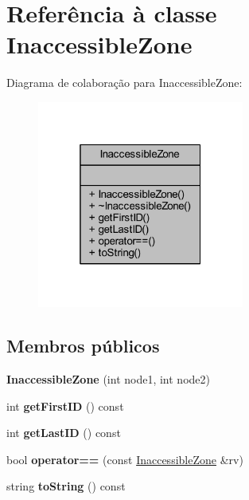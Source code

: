 \hypertarget{class_inaccessible_zone}{}\section{Referência à classe Inaccessible\+Zone}
\label{class_inaccessible_zone}


Diagrama de colaboração para Inaccessible\+Zone\+:
\nopagebreak
\begin{figure}[H]
\begin{center}
\leavevmode
\includegraphics[width=193pt]{class_inaccessible_zone__coll__graph}
\end{center}
\end{figure}
\subsection*{Membros públicos}
\begin{DoxyCompactItemize}
\item 
\hypertarget{class_inaccessible_zone_ac571011fba0cd079537990d67e5199fa}{}{\bfseries Inaccessible\+Zone} (int node1, int node2)\label{class_inaccessible_zone_ac571011fba0cd079537990d67e5199fa}

\item 
\hypertarget{class_inaccessible_zone_a409eaa2fbfb3f84317a89c81e07dbafe}{}int {\bfseries get\+First\+I\+D} () const \label{class_inaccessible_zone_a409eaa2fbfb3f84317a89c81e07dbafe}

\item 
\hypertarget{class_inaccessible_zone_ad797feb433c52fc0922ce166d4a6df1e}{}int {\bfseries get\+Last\+I\+D} () const \label{class_inaccessible_zone_ad797feb433c52fc0922ce166d4a6df1e}

\item 
\hypertarget{class_inaccessible_zone_a02480a51fb032c5fee74fab422fe5166}{}bool {\bfseries operator==} (const \hyperlink{class_inaccessible_zone}{Inaccessible\+Zone} \&rv)\label{class_inaccessible_zone_a02480a51fb032c5fee74fab422fe5166}

\item 
\hypertarget{class_inaccessible_zone_a1f6e8009d1892572c7072e4fb8bb1d31}{}string {\bfseries to\+String} () const \label{class_inaccessible_zone_a1f6e8009d1892572c7072e4fb8bb1d31}

\end{DoxyCompactItemize}


